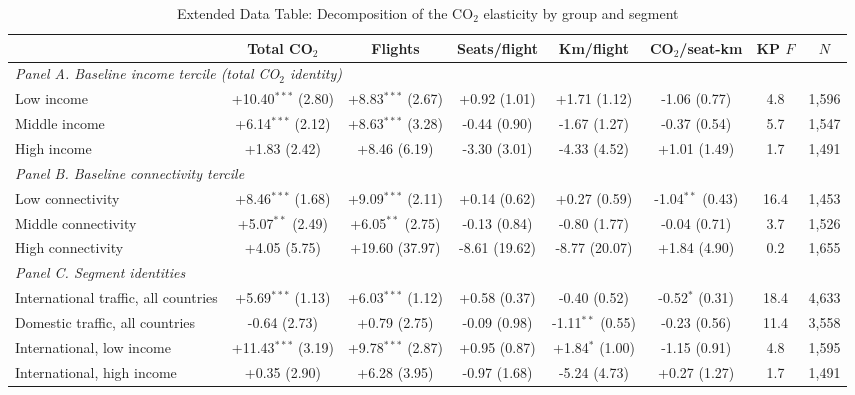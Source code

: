 \begin{table}[htbp]
\centering
\begin{threeparttable}
\caption{Extended Data Table: Decomposition of the CO$_2$ elasticity by group and segment}
\label{tab:decomp_hetero}
\scriptsize
\begin{tabular}{lccccccc}
\toprule
 & Total CO$_2$ & Flights & Seats/flight & Km/flight & CO$_2$/seat-km & KP $F$ & $N$ \\
\midrule
\multicolumn{8}{l}{\textit{Panel A. Baseline income tercile (total CO$_2$ identity)}} \\
  Low income & +10.40$^{***}$ (2.80) & +8.83$^{***}$ (2.67) & +0.92 (1.01) & +1.71 (1.12) & -1.06 (0.77) & 4.8 & 1,596 \\
  Middle income & +6.14$^{***}$ (2.12) & +8.63$^{***}$ (3.28) & -0.44 (0.90) & -1.67 (1.27) & -0.37 (0.54) & 5.7 & 1,547 \\
  High income & +1.83 (2.42) & +8.46 (6.19) & -3.30 (3.01) & -4.33 (4.52) & +1.01 (1.49) & 1.7 & 1,491 \\
\multicolumn{8}{l}{\textit{Panel B. Baseline connectivity tercile}} \\
  Low connectivity & +8.46$^{***}$ (1.68) & +9.09$^{***}$ (2.11) & +0.14 (0.62) & +0.27 (0.59) & -1.04$^{**}$ (0.43) & 16.4 & 1,453 \\
  Middle connectivity & +5.07$^{**}$ (2.49) & +6.05$^{**}$ (2.75) & -0.13 (0.84) & -0.80 (1.77) & -0.04 (0.71) & 3.7 & 1,526 \\
  High connectivity & +4.05 (5.75) & +19.60 (37.97) & -8.61 (19.62) & -8.77 (20.07) & +1.84 (4.90) & 0.2 & 1,655 \\
\multicolumn{8}{l}{\textit{Panel C. Segment identities}} \\
  International traffic, all countries & +5.69$^{***}$ (1.13) & +6.03$^{***}$ (1.12) & +0.58 (0.37) & -0.40 (0.52) & -0.52$^{*}$ (0.31) & 18.4 & 4,633 \\
  Domestic traffic, all countries & -0.64 (2.73) & +0.79 (2.75) & -0.09 (0.98) & -1.11$^{**}$ (0.55) & -0.23 (0.56) & 11.4 & 3,558 \\
  International, low income & +11.43$^{***}$ (3.19) & +9.78$^{***}$ (2.87) & +0.95 (0.87) & +1.84$^{*}$ (1.00) & -1.15 (0.91) & 4.8 & 1,595 \\
  International, high income & +0.35 (2.90) & +6.28 (3.95) & -0.97 (1.68) & -5.24 (4.73) & +0.27 (1.27) & 1.7 & 1,491 \\
\bottomrule
\end{tabular}

\end{threeparttable}
\end{table}
